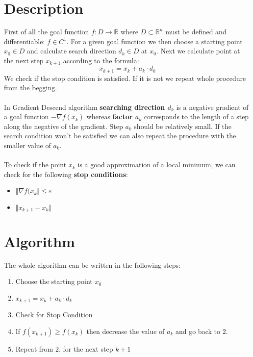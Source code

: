 \documentclass{book}
\begin{document}
\section{Description}
First of all the goal function $f:D \rightarrow \mathbb{R}$ where $D \subset \mathbb{R}^n$ must be defined and differentiable: $f \in C^1$.
For a given goal function we then choose a starting point $x_0 \in D$ and calculate search direction $d_k \in D$ at $x_0$. Next we calculate point at the next step $x_{k+1}$ according to the formula: $$x_{k+1} = x_k + a_k \cdot d_k$$
We check if the stop condition is satisfied. If it is not we repeat whole procedure from the begging. 
\\
\\
In Gradient Descend algorithm \textbf{searching direction $d_k$} is a negative gradient of a goal function $-\nabla f(x_k)$ whereas \textbf{factor $a_k$} corresponds to the length of a step along the negative of the gradient. Step $a_k$ should be relatively small. If the search condition won't be satisfied we can also repeat the procedure with the smaller value of $a_k$.
\\
\\ 
To check if the point $x_k$ is a good approximation of a local minimum, we can check for the following \textbf{stop conditions}:
\begin{itemize}
\item $\Vert \nabla f(x_k \Vert \leq \varepsilon$
\item $\Vert x_{k+1} - x_k \Vert$
\end{itemize}

\section{Algorithm}
The whole algorithm can be written in the following steps:
\begin{enumerate}
\item Choose the starting point $x_0$
\item $x_{k+1} = x_k + a_k \cdot d_k$
\item Check for Stop Condition
\item If $f(x_{k+1}) \geq f(x_k)$ then decrease the value of $a_k$ and go back to $2.$
\item Repeat from $2.$ for the next step $k+1$
\end{enumerate}
\end{document}
